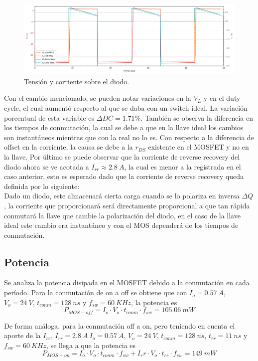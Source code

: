 \begin{figure}[H]
	\centering
	\includegraphics[width=\linewidth]{ImagenesEjercicio-3/id-vd-2v3}
	\caption{Tensión y corriente sobre el diodo.}
	\label{fig:ej3:Id_Vd}
\end{figure}

Con el cambio mencionado, se pueden notar variaciones en la $V_L$ y en el duty cycle, el cual aumentó respecto al que se daba con un switch ideal. La variación porcentual de esta variable es $\Delta DC = 1.71 \% $. También se observa la diferencia en los tiempos de conmutación, la cual se debe a que en la llave ideal los cambios son instantáneos mientras que con la real no lo es. Con respecto a la diferencia de offset en la corriente, la causa se debe a la $r_{DS}$ existente en el MOSFET y no en la llave. Por último se puede observar que la corriente de reverse recovery del diodo ahora se ve acotada a $I_{rr}\approx 2.8 \ A$, la cual es menor a la registrada en el caso anterior, esto es esperado dado que la corriente de reverse recovery queda definida por lo siguiente:\\
Dado un diodo, este almacenará cierta carga cuando se lo polariza en inversa $\Delta Q$, la corriente que proporcionará será directamente proporcional a que tan rápida conmutará la llave que cambie la polarización del diodo, en el caso de la llave ideal este cambio era instantáneo y con el MOS dependerá de los tiempos de conmutación.

\subsection{Potencia}
Se analiza la potencia disipada en el MOSFET debido a la conmutación en cada período.
Para la conmutación de on a off se obtiene que con $I_o = 0.57 \ A$, $V_o = 24 \ V$, $t_{conm}= 128 \ ns$ y $f_{sw}=60 \ KHz$, la potencia es
\begin{equation}
P_{MOS-off}=I_o \cdot V_o \cdot t_{conm} \cdot f_{sw} = 105.06 \ mW
\end{equation}

De forma análoga, para la conmutación off a on, pero teniendo en cuenta el aporte de la $I_{rr}$, $I_{rr} = 2.8 \ A \ I_o = 0.57 \ A$, $V_o = 24 \ V$, $ t_{conm}= 128 \ ns$, $ t_{rr}= 11 \ ns$ y $f_{sw}=60 \ KHz$, se llega a que la potencia es
\begin{equation}
P_{MOS-on}=I_o \cdot V_o \cdot t_{conm} \cdot f_{sw} + I_rr \cdot V_o \cdot t_{rr} \cdot f_{sw}=  149\ mW
\end{equation}


